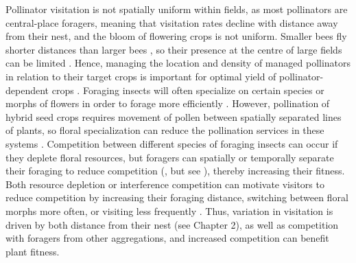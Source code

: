 \documentclass[12pt, draft]{article} %
\begin{document}
Pollinator visitation is not spatially uniform within fields, as most pollinators are central-place foragers, meaning that visitation rates decline with distance away from their nest, and the bloom of flowering crops is not uniform. %
Smaller bees fly shorter distances than larger bees \citep{greenleaf2007,zurbuchen2010}, so their presence at the centre of large fields can be limited \citep{isaacs2010}. 
Hence, managing the location and density of managed pollinators in relation to their target crops is important for optimal yield of pollinator-dependent crops \citep{fries1983,cresswell2004b}.
Foraging insects will often specialize on certain species or morphs of flowers in order to forage more efficiently \citep{heinrich1976b, goulson1997}. 
However, pollination of hybrid seed crops requires movement of pollen between spatially separated lines of plants, so floral specialization can reduce the pollination services in these systems \citep{waytesMsc, gaffney2019}.
Competition between different species of foraging insects can occur if they deplete floral resources, but foragers can spatially or temporally separate their foraging to reduce competition (\citealp{schaffer1979,thomson1987}, but see \citealp{steffan2000}), thereby increasing their fitness. 
Both resource depletion or interference competition can motivate visitors to reduce competition by increasing their foraging distance, switching between floral morphs more often, or visiting less frequently \citep{heinrich1979, greenleaf2006}.
Thus, variation in visitation is driven by both distance from their nest (see Chapter 2), as well as competition with foragers from other aggregations, and increased competition can benefit plant fitness.
\end{document}
